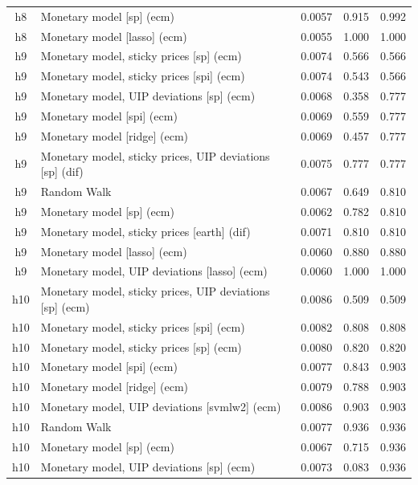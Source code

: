 \begin{ThreePartTable}
\begin{longtable}[t]{cp{5.5cm}ccc}
h8 & \raggedright Monetary model [sp] (ecm) & 0.0057 & 0.915 & 0.992\\
h8 & \raggedright Monetary model [lasso] (ecm) & 0.0055 & 1.000 & 1.000\\
\addlinespace
h9 & \raggedright Monetary model, sticky prices [sp] (ecm) & 0.0074 & 0.566 & 0.566\\
h9 & \raggedright Monetary model, sticky prices [spi] (ecm) & 0.0074 & 0.543 & 0.566\\
h9 & \raggedright Monetary model, UIP deviations [sp] (ecm) & 0.0068 & 0.358 & 0.777\\
h9 & \raggedright Monetary model [spi] (ecm) & 0.0069 & 0.559 & 0.777\\
h9 & \raggedright Monetary model [ridge] (ecm) & 0.0069 & 0.457 & 0.777\\
h9 & \raggedright Monetary model, sticky prices, UIP deviations [sp] (dif) & 0.0075 & 0.777 & 0.777\\
h9 & \raggedright Random Walk & 0.0067 & 0.649 & 0.810\\
h9 & \raggedright Monetary model [sp] (ecm) & 0.0062 & 0.782 & 0.810\\
h9 & \raggedright Monetary model, sticky prices [earth] (dif) & 0.0071 & 0.810 & 0.810\\
h9 & \raggedright Monetary model [lasso] (ecm) & 0.0060 & 0.880 & 0.880\\
h9 & \raggedright Monetary model, UIP deviations [lasso] (ecm) & 0.0060 & 1.000 & 1.000\\
\addlinespace
h10 & \raggedright Monetary model, sticky prices, UIP deviations [sp] (ecm) & 0.0086 & 0.509 & 0.509\\
h10 & \raggedright Monetary model, sticky prices [spi] (ecm) & 0.0082 & 0.808 & 0.808\\
h10 & \raggedright Monetary model, sticky prices [sp] (ecm) & 0.0080 & 0.820 & 0.820\\
h10 & \raggedright Monetary model [spi] (ecm) & 0.0077 & 0.843 & 0.903\\
h10 & \raggedright Monetary model [ridge] (ecm) & 0.0079 & 0.788 & 0.903\\
h10 & \raggedright Monetary model, UIP deviations [svmlw2] (ecm) & 0.0086 & 0.903 & 0.903\\
h10 & \raggedright Random Walk & 0.0077 & 0.936 & 0.936\\
h10 & \raggedright Monetary model [sp] (ecm) & 0.0067 & 0.715 & 0.936\\
h10 & \raggedright Monetary model, UIP deviations [sp] (ecm) & 0.0073 & 0.083 & 0.936\\

\end{longtable}
\end{ThreePartTable}
